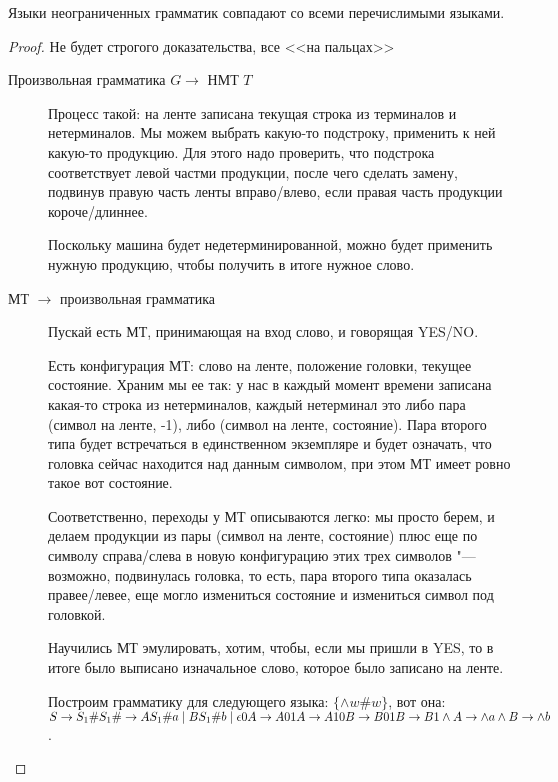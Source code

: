 \begin{theorem}
Языки неограниченных грамматик совпадают со всеми перечислимыми языками.
\end{theorem}
\begin{proof}
Не будет строгого доказательства, все <<на пальцах>>
\begin{description}
\item[Произвольная грамматика $G \to$ НМТ $T$]
Процесс такой: на ленте записана текущая строка из терминалов и нетерминалов. Мы можем выбрать какую-то подстроку, применить к ней какую-то продукцию.
Для этого надо проверить, что подстрока соответствует левой частми продукции, после чего сделать замену, подвинув правую часть ленты вправо/влево, если правая часть продукции короче/длиннее.

Поскольку машина будет недетерминированной, можно будет применить нужную продукцию, чтобы получить в итоге нужное слово.

\item[МТ $\to$ произвольная грамматика]
Пускай есть МТ, принимающая на вход слово, и говорящая YES/NO. 

Есть конфигурация МТ: слово на ленте, положение головки, текущее состояние. 
Храним мы ее так: у нас в каждый момент времени записана какая-то строка из нетерминалов, каждый нетерминал это либо пара (символ на ленте, -1), либо (символ на ленте, состояние).
Пара второго типа будет встречаться в единственном экземпляре и будет означать, что головка сейчас находится над данным символом, при этом МТ имеет ровно такое вот состояние.

Соответственно, переходы у МТ описываются легко: мы просто берем, и делаем продукции из пары (символ на ленте, состояние) плюс еще по символу справа/слева в новую конфигурацию этих трех символов "---
возможно, подвинулась головка, то есть, пара второго типа оказалась правее/левее, еще могло измениться состояние и измениться символ под головкой.

Научились МТ эмулировать, хотим, чтобы, если мы пришли в YES, то в итоге было выписано изначальное слово, которое было записано на ленте.
                                                
Построим грамматику для следующего языка: $\{\wedge w\#w\}$, вот она:
$\\
S \to S_1\# \\
S_1\# \to AS_1\#a \mid BS_1\#b \mid \epsilon \\
0A \to A0 \\
1A \to A1 \\
0B \to B0 \\
1B \to B1 \\
\wedge A \to \wedge a \\
\wedge B \to \wedge b$.


\end{description}
\end{proof}
